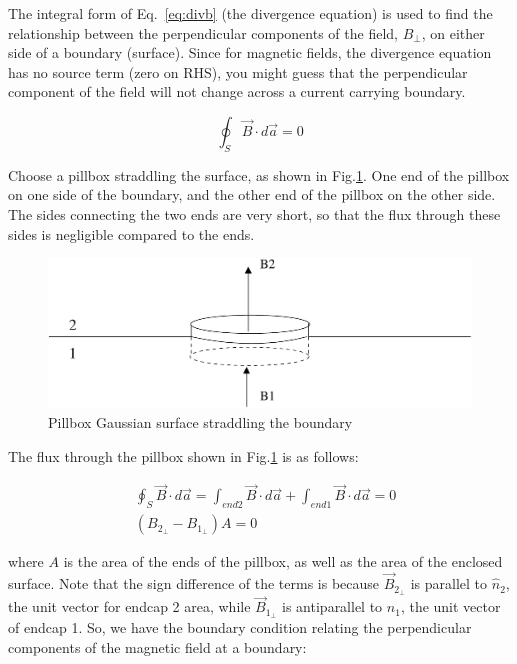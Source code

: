 \documentclass[12pt]{article}
\begin{document}
\begin{flushleft}
The integral form of Eq.~\ref{eq:divb} (the divergence equation) is used to find the relationship between the perpendicular components of the field, $B_{\perp}$, on either side of a boundary (surface).  Since for magnetic fields, the divergence equation has no source term (zero on RHS), you might guess that the perpendicular component of the field will not change across a current carrying boundary.

\begin{equation*}
\oint_{S} \vec{B} \cdot d\vec{a} = 0 
\label{eq:gauss}
\end{equation*}    

Choose a pillbox straddling the surface, as shown in Fig.\ref{fig:pillbox}.  One end of the pillbox on one side of the boundary, and the other end of the pillbox on the other side.  The sides connecting the two ends are very short, so that the flux through these sides is negligible compared to the ends.
\vspace{.2in}

\begin{figure}[h]
\centering
\includegraphics*[trim=0cm 0cm 0cm 0cm, clip=true, width=0.6\columnwidth]{Bperp_bc.pdf}
\caption{Pillbox Gaussian surface straddling the boundary }
\label{fig:pillbox}
\end{figure}


The flux through the pillbox shown in Fig.\ref{fig:pillbox} is as follows:

\begin{equation*}
\begin{aligned}
& \oint_{S} \vec{B} \cdot d\vec{a} = \int_{end2} \vec{B} \cdot d\vec{a}+ \int_{end1} \vec{B} \cdot d\vec{a} = 0 \\
& (B_{2_{\perp}} - B_{1_{\perp}}) A  =0 
\end{aligned} 
\end{equation*}

where $A$ is the area of the ends of the pillbox, as well as the area of the enclosed surface.  Note that the sign difference of the terms is because $\vec{B}_{2_{\perp}}$ is parallel to $\hat{n}_{2}$, the unit vector for endcap 2 area, while $\vec{B}_{1_{\perp}}$ is antiparallel to $\hat{n}_{1}$, the unit vector of endcap 1.  So, we have the boundary condition relating the perpendicular components of the magnetic field at a boundary:


\end{flushleft}
\end{document}
